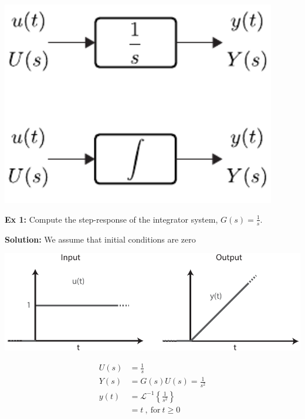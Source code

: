 \documentclass[twoside]{article}
\begin{document}
    \begin{center}    
        \begin{minipage}[h]{0.5\linewidth}
    \begin{center}
      \includegraphics[width=0.9\textwidth]{int}
    \end{center}
  \end{minipage}
      \end{center}
      
      \textbf{Ex 1:} Compute the step-response of the integrator system, $G(s) = \frac{1}{s}$.
      
      \textbf{Solution:} We assume that initial conditions are zero
      
          \begin{minipage}[h]{0.7\linewidth}
    \begin{center}
      \includegraphics[width=1\textwidth]{signals}
    \end{center}
  \end{minipage}
    \begin{minipage}[h]{0.3\linewidth}
    \begin{center}
      \begin{align*}
      	U(s) &= \frac{1}{s} 
	\\
	Y(s) &= G(s) U(s) = \frac{1}{s^2}  
	\\
	y(t) &= \mathcal{L}^{-1} \left\lbrace \frac{1}{s^2}  \right\rbrace
	\\
	&= t \ , \ \mathrm{for} \ t \geq 0
      \end{align*}
    \end{center}
  \end{minipage}
     
\end{document}
